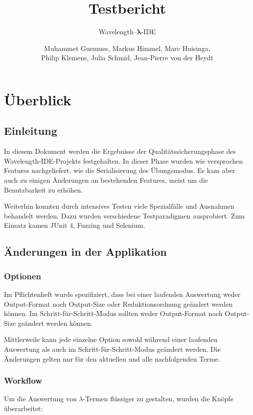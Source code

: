 \documentclass[parskip=full,11pt,openany]{scrreprt}
\title{Testbericht}
\subtitle{Wavelength--$\bm{\lambda}$-IDE}
\author{Muhammet Guemues, Markus Himmel, Marc Huisinga,\\Philip Klemens, Julia Schmid, Jean-Pierre von der Heydt}
\begin{document}
\maketitle
\newpage
\tableofcontents
\newpage

\chapter{Überblick}

\section{Einleitung}

In diesem Dokument werden die Ergebnisse der Qualitätssicherungsphase des Wavelength-IDE-Projekts festgehalten.
In dieser Phase wurden wie versprochen Features nachgeliefert, wie die Serialisierung des Übungsmodus.
Es kam aber auch zu einigen Änderungen an bestehenden Features, meist um die Benutzbarkeit zu erhöhen.

Weiterhin konnten durch intensives Testen viele Spezialfälle und Ausnahmen behandelt werden.
Dazu wurden verschiedene Testparadigmen ausprobiert.
Zum Einsatz kamen JUnit 4, Fuzzing und Selenium.

\section{Änderungen in der Applikation}
\subsection{Optionen}
Im Pflichtenheft wurde spezifiziert, dass bei einer laufenden Auswertung weder Output-Format noch Output-Size
oder Reduktionsordnung geändert werden können. Im Schritt-für-Schritt-Modus sollten weder Output-Format noch
Output-Size geändert werden können. 

Mittlerweile kann jede einzelne Option sowohl während einer laufenden Auswertung als auch im Schritt-für-Schritt-Modus
geändert werden. Die Änderungen gelten nur für den aktuellen und alle nachfolgenden Terme.

\subsection{Workflow}\label{changeWorkflow}
Um die Auswertung von $\lambda$-Termen flüssiger zu gestalten, wurden die Knöpfe überarbeitet:
\end{document}
